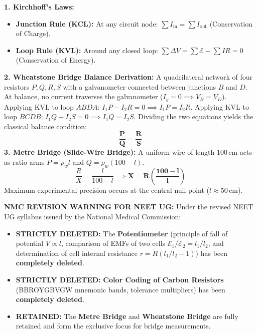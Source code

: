 \documentclass[10pt,a4paper]{article}
\begin{document}
\begin{formulabox}
\textbf{1. Kirchhoff's Laws:}
\begin{itemize}
  \item \textbf{Junction Rule (KCL):} At any circuit node: $\sum I_{\text{in}} = \sum I_{\text{out}}$ (Conservation of Charge).
  \item \textbf{Loop Rule (KVL):} Around any closed loop: $\sum \Delta V = \sum \mathcal{E} - \sum I R = 0$ (Conservation of Energy).
\end{itemize}
\textbf{2. Wheatstone Bridge Balance Derivation:}
A quadrilateral network of four resistors $P, Q, R, S$ with a galvanometer connected between junctions $B$ and $D$.
At balance, no current traverses the galvanometer ($I_g = 0 \implies V_B = V_D$).
Applying KVL to loop $ABDA$: $I_1 P - I_2 R = 0 \implies I_1 P = I_2 R$.
Applying KVL to loop $BCDB$: $I_1 Q - I_2 S = 0 \implies I_1 Q = I_2 S$.
Dividing the two equations yields the classical balance condition:
\begin{equation}
  \mathbf{\frac{P}{Q} = \frac{R}{S}}
\end{equation}
\textbf{3. Metre Bridge (Slide-Wire Bridge):}
A uniform wire of length $100\,\mathrm{cm}$ acts as ratio arms $P = \rho_w l$ and $Q = \rho_w (100 - l)$.
\begin{equation}
  \frac{R}{X} = \frac{l}{100 - l} \implies \mathbf{X = R \left(\frac{100 - l}{l}\right)}
\end{equation}
Maximum experimental precision occurs at the central null point ($l \approx 50\,\mathrm{cm}$).
\end{formulabox}

\begin{trapbox}
\textbf{NMC REVISION WARNING FOR NEET UG:}
Under the revised NEET UG syllabus issued by the National Medical Commission:
\begin{itemize}
  \item \textbf{STRICTLY DELETED:} The \textbf{Potentiometer} (principle of fall of potential $V \propto l$, comparison of EMFs of two cells $\mathcal{E}_1/\mathcal{E}_2 = l_1/l_2$, and determination of cell internal resistance $r = R(l_1/l_2 - 1)$) has been \textbf{completely deleted}.
  \item \textbf{STRICTLY DELETED:} \textbf{Color Coding of Carbon Resistors} (BBROYGBVGW mnemonic bands, tolerance multipliers) has been \textbf{completely deleted}.
  \item \textbf{RETAINED:} The \textbf{Metre Bridge} and \textbf{Wheatstone Bridge} are fully retained and form the exclusive focus for bridge measurements.
\end{itemize}
\end{trapbox}
\end{document}
